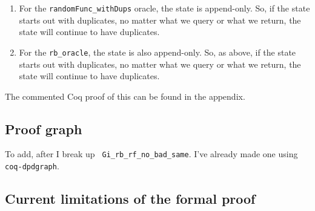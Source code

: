 \documentclass[12pt,lot, lof]{puthesis}
\newcommand{\li} {\lstinline}
\begin{document}
{\begin{enumerate}
	The second part of the postcondition is easy to discharge: 
	\begin{lstlisting}
	(hasDups D_EqDec (fst (split (snd y1))) = false ->
       snd y1 = snd y2 /\ fst y1 = fst y2)
       \end{lstlisting}
       It starts with the assumption that there are no duplicates in the entire state. But, by our case analysis earlier, we are in the case where there are duplicates in the tail of the state, which implies that there are duplicates in the entire state. So, we can eliminate this case.
       
       The first part of the postcondition,
       
       \begin{lstlisting}
       hasDups D_EqDec (fst (split (snd y1))) =
      hasDups D_EqDec (fst (split (snd y2)))
      \end{lstlisting}
      
      requires us to prove that whether the \li|randomFunc_withDups| oracle has duplicates equals whether the \li|rb_oracle| has dups. This follows because they started with the same initial state, which has duplicates.
       \li|hasDups (thing1 :: x2) = hasDups (thing2 :: x2)| since \li|hasDups x2|
	
\item For the \li|randomFunc_withDups| oracle, the state is append-only. So, if the state starts out with duplicates, no matter what we query or what we return, the state will continue to have duplicates. 

\item For the \li|rb_oracle|, the state is also append-only. So, as above, if the state starts out with duplicates, no matter what we query or what we return, the state will continue to have duplicates. 

\end{enumerate}

The commented Coq proof of this can be found in the appendix.

\subsection{Proof graph}

To add, after I break up \li| Gi_rb_rf_no_bad_same|. I've already made one using \li|coq-dpdgraph|.

\subsection{Current limitations of the formal proof}

}
\end{document}
